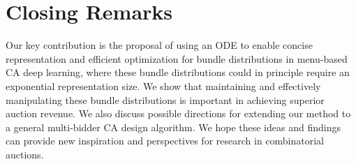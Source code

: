 \section{Closing Remarks}

Our key contribution is the proposal of using an ODE to enable concise representation and efficient optimization for 
bundle distributions in menu-based CA deep learning, where these bundle distributions could in principle require an exponential representation size. We show that maintaining and effectively manipulating these  bundle distributions is important in achieving superior auction revenue. We also discuss possible directions for extending our method to a general multi-bidder CA design algorithm. We hope these ideas and findings can provide new inspiration and perspectives for research in combinatorial auctions.


